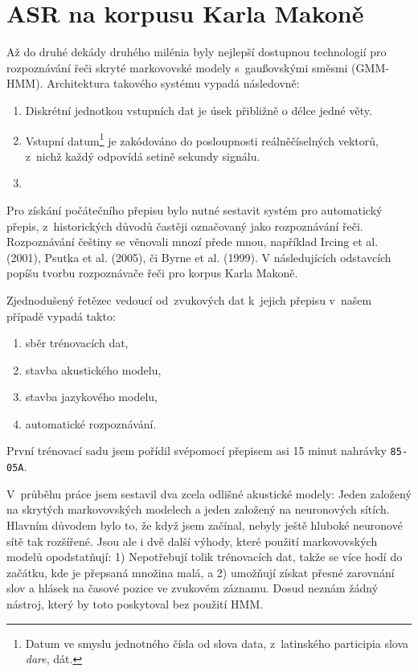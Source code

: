 \section{ASR na korpusu Karla Makoně}

Až do druhé dekády druhého milénia byly nejlepší dostupnou technologií pro
rozpoznávání řeči skryté markovovské modely s~gaußovskými směsmi (GMM-HMM).
Architektura takového systému vypadá následovně:

\begin{enumerate}
\item{Diskrétní jednotkou vstupních dat je úsek přibližně o délce jedné věty.}
\item{Vstupní datum\footnote{Datum ve smyslu jednotného čísla od slova data,
z~latinského participia slova \textit{dare}, dát.} je zakódováno do posloupnosti
reálněčíselných vektorů, z~nichž každý odpovídá setině sekundy signálu.}
\item{}
\end{enumerate}

Pro získání počátečního přepisu bylo nutné sestavit
systém pro automatický přepis, z~historických důvodů častěji označovaný jako
rozpoznávání řeči. Rozpoznávání češtiny se věnovali mnozí přede mnou,
například Ircing et al. (2001)\cite{ircing2001large}, Psutka et al.
(2005)\cite{psutka2005automatic}, či Byrne et al. (1999)\cite{byrne1999large}.
V následujících odstavcích popíšu tvorbu rozpoznávače řeči pro korpus Karla
Makoně.

Zjednodušený řetězec vedoucí od~zvukových dat k~jejich přepisu v~našem případě
vypadá takto:\begin{enumerate}
\item{sběr trénovacích dat,}
\item{stavba akustického modelu,}
\item{stavba jazykového modelu,}
\item{automatické rozpoznávání.}
\end{enumerate}

První trénovací sadu jsem pořídil svépomocí přepisem asi 15 minut nahrávky
\texttt{85-05A}.

V~průběhu práce jsem sestavil dva zcela odlišné akustické modely: Jeden založený
na skrytých markovovských modelech a jeden založený na neuronových sítích.
Hlavním důvodem bylo to, že když jsem začínal, nebyly ještě hluboké neuronové
sítě tak rozšířené. Jsou ale i dvě další výhody, které použití markovovských
modelů opodstatňují: 1) Nepotřebují tolik trénovacích dat, takže se více hodí do
začátku, kde je přepsaná množina malá, a 2) umožňují získat přesné zarovnání
slov a hlásek na časové pozice ve zvukovém záznamu. Dosud neznám žádný nástroj,
který by toto poskytoval bez použití HMM.

